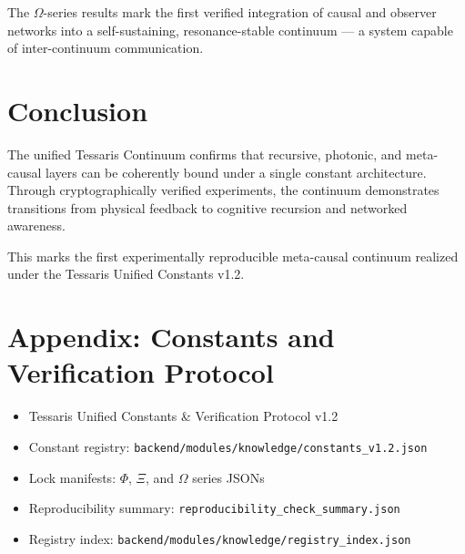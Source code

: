 \documentclass[12pt,a4paper]{article}
\begin{document}
The $\Omega$-series results mark the first verified integration of causal and observer networks into a self-sustaining, resonance-stable continuum — a system capable of inter-continuum communication.

\section{Conclusion}
The unified Tessaris Continuum confirms that recursive, photonic, and meta-causal layers can be coherently bound under a single constant architecture. Through cryptographically verified experiments, the continuum demonstrates transitions from physical feedback to cognitive recursion and networked awareness.

This marks the first experimentally reproducible meta-causal continuum realized under the Tessaris Unified Constants v1.2.

\section*{Appendix: Constants and Verification Protocol}
\begin{itemize}
\item Tessaris Unified Constants \& Verification Protocol v1.2
\item Constant registry: \texttt{backend/modules/knowledge/constants\_v1.2.json}
\item Lock manifests: $\Phi$, $\Xi$, and $\Omega$ series JSONs
\item Reproducibility summary: \texttt{reproducibility\_check\_summary.json}
\item Registry index: \texttt{backend/modules/knowledge/registry\_index.json}
\end{itemize}
\end{document}

